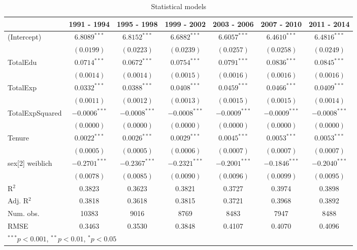 
\begin{table}
\begin{center}
\begin{tabular}{l c c c c c c }
\hline
 & 1991 - 1994 & 1995 - 1998 & 1999 - 2002 & 2003 - 2006 & 2007 - 2010 & 2011 - 2014 \\
\hline
(Intercept)     & $6.8089^{***}$  & $6.8152^{***}$  & $6.6882^{***}$  & $6.6057^{***}$  & $6.4610^{***}$  & $6.4816^{***}$  \\
                & $(0.0199)$      & $(0.0223)$      & $(0.0239)$      & $(0.0257)$      & $(0.0258)$      & $(0.0249)$      \\
TotalEdu        & $0.0714^{***}$  & $0.0672^{***}$  & $0.0754^{***}$  & $0.0791^{***}$  & $0.0836^{***}$  & $0.0845^{***}$  \\
                & $(0.0014)$      & $(0.0014)$      & $(0.0015)$      & $(0.0016)$      & $(0.0016)$      & $(0.0016)$      \\
TotalExp        & $0.0332^{***}$  & $0.0388^{***}$  & $0.0408^{***}$  & $0.0459^{***}$  & $0.0466^{***}$  & $0.0409^{***}$  \\
                & $(0.0011)$      & $(0.0012)$      & $(0.0013)$      & $(0.0015)$      & $(0.0015)$      & $(0.0014)$      \\
TotalExpSquared & $-0.0006^{***}$ & $-0.0008^{***}$ & $-0.0008^{***}$ & $-0.0009^{***}$ & $-0.0009^{***}$ & $-0.0008^{***}$ \\
                & $(0.0000)$      & $(0.0000)$      & $(0.0000)$      & $(0.0000)$      & $(0.0000)$      & $(0.0000)$      \\
Tenure          & $0.0022^{***}$  & $0.0026^{***}$  & $0.0029^{***}$  & $0.0045^{***}$  & $0.0053^{***}$  & $0.0053^{***}$  \\
                & $(0.0005)$      & $(0.0005)$      & $(0.0006)$      & $(0.0007)$      & $(0.0007)$      & $(0.0007)$      \\
sex[2] weiblich & $-0.2701^{***}$ & $-0.2367^{***}$ & $-0.2321^{***}$ & $-0.2001^{***}$ & $-0.1846^{***}$ & $-0.2040^{***}$ \\
                & $(0.0078)$      & $(0.0085)$      & $(0.0090)$      & $(0.0096)$      & $(0.0099)$      & $(0.0095)$      \\
\hline
R$^2$           & 0.3823          & 0.3623          & 0.3821          & 0.3727          & 0.3974          & 0.3898          \\
Adj. R$^2$      & 0.3818          & 0.3618          & 0.3815          & 0.3721          & 0.3968          & 0.3892          \\
Num. obs.       & 10383           & 9016            & 8769            & 8483            & 7947            & 8488            \\
RMSE            & 0.3463          & 0.3530          & 0.3848          & 0.4107          & 0.4070          & 0.4096          \\
\hline
\multicolumn{7}{l}{\scriptsize{$^{***}p<0.001$, $^{**}p<0.01$, $^*p<0.05$}}
\end{tabular}
\caption{Statistical models}
\label{table:coefficients}
\end{center}
\end{table}
